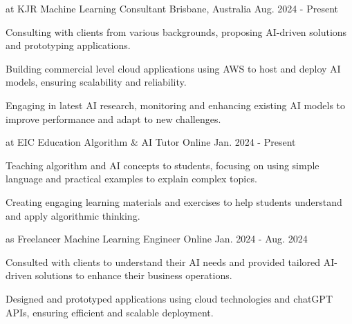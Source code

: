 

\begin{cventries}

  \cventry
    {at KJR} %
    {Machine Learning Consultant} %
    {Brisbane, Australia} %
    {Aug. 2024 - Present} %
    {
      \begin{cvitems} %
        \item {Consulting with clients from various backgrounds, proposing AI-driven solutions and prototyping applications.}
        \item {Building commercial level cloud applications using AWS to host and deploy AI models, ensuring scalability and reliability.}
        \item {Engaging in latest AI research, monitoring and enhancing existing AI models to improve performance and adapt to new challenges.}
      \end{cvitems}
    }

  \cventry
    {at EIC Education} %
    {Algorithm \& AI Tutor} %
    {Online} %
    {Jan. 2024 - Present} %
    {
      \begin{cvitems} %
        \item {Teaching algorithm and AI concepts to students, focusing on using simple language and practical examples to explain complex topics.}
        \item {Creating engaging learning materials and exercises to help students understand and apply algorithmic thinking.}
      \end{cvitems}
    }

  \cventry
    {as Freelancer} %
    {Machine Learning Engineer} %
    {Online} %
    {Jan. 2024 - Aug. 2024} %
    {
      \begin{cvitems} %
        \item {Consulted with clients to understand their AI needs and provided tailored AI-driven solutions to enhance their business operations.}
        \item {Designed and prototyped applications using cloud technologies and chatGPT APIs, ensuring efficient and scalable deployment.}
      \end{cvitems}
    }


\end{cventries}
